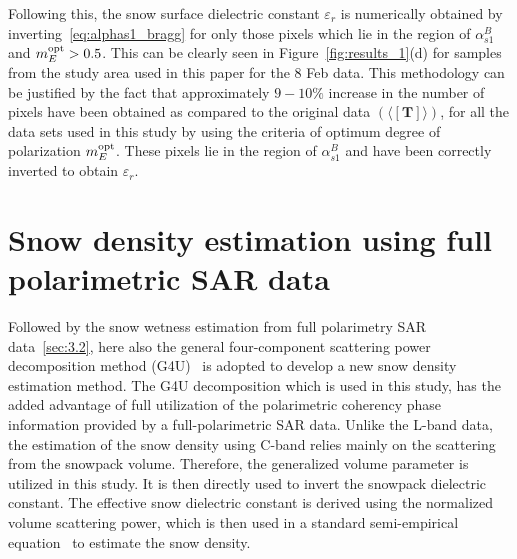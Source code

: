 Following this, the snow surface dielectric constant $\varepsilon_{r}$ is numerically obtained by inverting~\eqref{eq:alphas1_bragg} for only those pixels which lie in the region of $\alpha_{s1}^{B}$ and $m_{E}^{\mbox{\scriptsize opt}} > 0.5$. This can be clearly seen in Figure~\ref{fig:results_1}(d) for samples from the study area used in this paper for the 8 Feb data. This methodology can be justified by the fact that approximately $9-10\%$ increase in the number of pixels have been obtained as compared to the original data $(\langle[{\mathbf{T}}]\rangle)$, for all the data sets used in this study by using the criteria of optimum degree of polarization $m_{E}^{\mbox{\scriptsize opt}}$. These pixels lie in the region of $\alpha_{s1}^{B}$ and have been correctly inverted to obtain $\varepsilon_{r}$. 

\section{Snow density estimation using full polarimetric SAR data}
\label{sec:3.4}
Followed by the snow wetness estimation from full polarimetry SAR data~\ref{sec:3.2}, here also the general four-component scattering power decomposition method (G4U)~\citep{singh13} is adopted to develop a new snow density estimation method. The G4U decomposition which is used in this study, has the added advantage of full utilization of the polarimetric coherency phase information provided by a full-polarimetric SAR data. Unlike the L-band data, the estimation of the snow density using C-band relies mainly on the scattering from the snowpack volume. Therefore, the generalized volume parameter is utilized in this study. It is then directly used to invert the snowpack dielectric constant. The effective snow dielectric constant is derived using the normalized volume scattering power, which is then used in a standard semi-empirical equation~\citep{looyenga1965dielectric} to estimate the snow density. 

